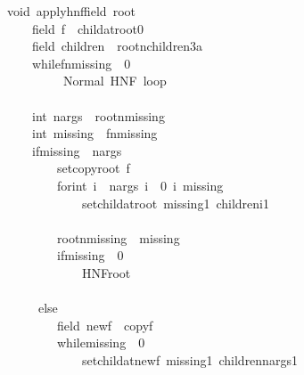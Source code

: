 \documentclass{book}
\theoremstyle{definition}
\begin{document}
\begin{figure}
\begin{tabbing}\ttfamily
~void~applyhnffield~root~\\
\ttfamily ~~~~~field~f~~childatroot0\\
\ttfamily ~~~~~field~children~~rootnchildren3a\\
\ttfamily ~~~~~whilefnmissing~~0~\\
\ttfamily ~~~~~~~~~~Normal~HNF~loop\\
\ttfamily ~~~~~\\
\ttfamily ~~~~~int~nargs~~rootnmissing\\
\ttfamily ~~~~~int~missing~~fnmissing\\
\ttfamily ~~~~~ifmissing~~nargs~\\
\ttfamily ~~~~~~~~~setcopyroot~f\\
\ttfamily ~~~~~~~~~forint~i~~nargs~i~~0~i~missing~\\
\ttfamily ~~~~~~~~~~~~~setchildatroot~missing1~childreni1\\
\ttfamily ~~~~~~~~~\\
\ttfamily ~~~~~~~~~rootnmissing~~missing\\
\ttfamily ~~~~~~~~~ifmissing~~0~\\
\ttfamily ~~~~~~~~~~~~~HNFroot\\
\ttfamily ~~~~~~~~~\\
\ttfamily ~~~~~~else~\\
\ttfamily ~~~~~~~~~field~newf~~copyf\\
\ttfamily ~~~~~~~~~whilemissing~~0~\\
\ttfamily ~~~~~~~~~~~~~setchildatnewf~missing1~childrennargs1\\

\end{tabbing}
\end{figure}
\end{document}
